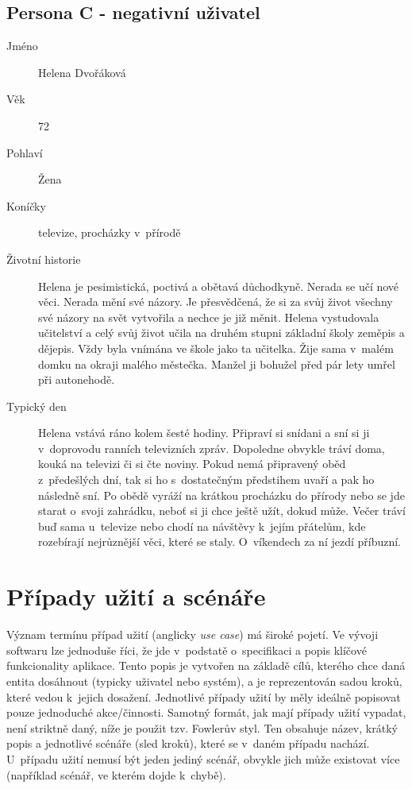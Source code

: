 \documentclass[thesis=M,czech]{FITthesis}[2019/12/23]
\begin{document}
\subsection{Persona C - negativní uživatel}
\begin{description}
    \item[Jméno] Helena Dvořáková
    \item[Věk] 72
    \item[Pohlaví] Žena
    \item[Koníčky] televize, procházky v~přírodě
    \item[Životní historie] Helena je pesimistická, poctivá a obětavá důchodkyně. Nerada se učí nové věci. Nerada mění své názory. Je přesvědčená, že si za svůj život všechny své názory na svět vytvořila a nechce je již měnit. Helena vystudovala učitelství a celý svůj život učila na druhém stupni základní školy zeměpis a dějepis. Vždy byla vnímána ve škole jako ta  učitelka. Žije sama v~malém domku na okraji malého městečka. Manžel ji bohužel před pár lety umřel při autonehodě.
    \item[Typický den] Helena vstává ráno kolem šesté hodiny. Připraví si snídani a sní si ji v~doprovodu ranních televizních zpráv. Dopoledne obvykle tráví doma, kouká na televizi či si čte noviny. Pokud nemá připravený oběd z~předešlých dní, tak si ho s~dostatečným předstihem uvaří a pak ho následně sní. Po obědě vyráží na krátkou procházku do přírody nebo se jde starat o~svoji zahrádku, neboť si ji chce ještě užít, dokud může. Večer tráví buď sama u~televize nebo chodí na návštěvy k~jejím přátelům, kde rozebírají nejrůznější věci, které se staly. O~víkendech za ní jezdí příbuzní.
\end{description}

\section{Případy užití a scénáře}

Význam termínu případ užití (anglicky \textit{use case}) má široké pojetí. Ve vývoji softwaru lze jednoduše říci, že jde v~podstatě o~specifikaci a popis klíčové funkcionality aplikace. Tento popis je vytvořen na základě cílů, kterého chce daná entita dosáhnout (typicky uživatel nebo systém), a je reprezentován sadou kroků, které vedou k~jejich dosažení. Jednotlivé případy užití by měly ideálně popisovat pouze jednoduché akce/činnosti. Samotný formát, jak mají případy užití vypadat, není striktně daný, níže je použit tzv. Fowlerův styl. Ten obsahuje název, krátký popis a jednotlivé scénáře (sled kroků), které se v~daném případu nachází. U~případu užití nemusí být jeden jediný scénář, obvykle jich může existovat více (například scénář, ve kterém dojde k~chybě). \cite{use-cases-2, ui-design-steps}
\end{document}
